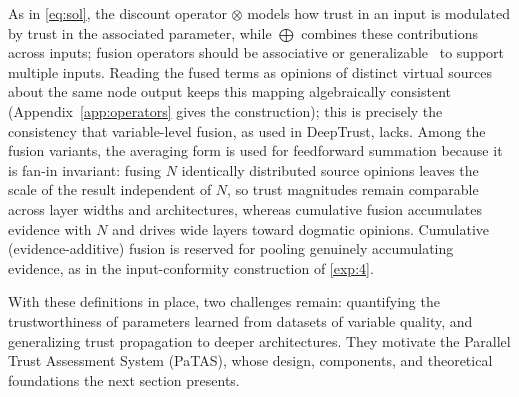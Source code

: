 As in \cref{eq:sol}, the discount operator \( \otimes \) models how trust in an input is modulated by trust in the associated parameter, while \( \bigoplus \) combines these contributions across inputs; fusion operators should be associative or generalizable~\cite{vanderheijden2018multisourcefusionoperationssubjective} to support multiple inputs. Reading the fused terms as opinions of distinct virtual sources about the same node output keeps this mapping algebraically consistent (Appendix~\ref{app:operators} gives the construction); this is precisely the consistency that variable-level fusion, as used in DeepTrust, lacks. Among the fusion variants, the averaging form is used for feedforward summation because it is fan-in invariant: fusing $N$ identically distributed source opinions leaves the scale of the result independent of $N$, so trust magnitudes remain comparable across layer widths and architectures, whereas cumulative fusion accumulates evidence with $N$ and drives wide layers toward dogmatic opinions. Cumulative (evidence-additive) fusion is reserved for pooling genuinely accumulating evidence, as in the input-conformity construction of \cref{exp:4}.

With these definitions in place, two challenges remain: quantifying the trustworthiness of parameters learned from datasets of variable quality, and generalizing trust propagation to deeper architectures. They motivate the Parallel Trust Assessment System (PaTAS), whose design, components, and theoretical foundations the next section presents.